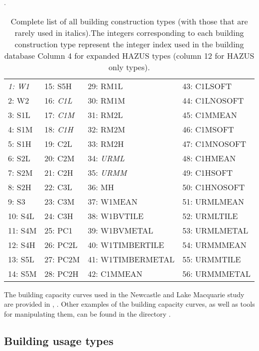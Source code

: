 \begin{table}[htp]
\centering \caption{Complete list of all building construction
types (with those that are rarely used in italics).The integers
corresponding to each building construction type represent the
integer index used in the building database Column 4 for expanded HAZUS types (column 12 for HAZUS
only types).} \vspace{0.8em} \label{tab:v-dam-allbtypes}.
\begin{tabular}{|llll|}
 \hline
\it 1: W1 &   15: S5H &     29: RM1L &           43: C1LSOFT  \\
    2: W2 &   16: \it C1L & 30: RM1M &           44: C1LNOSOFT \\
    3: S1L &  17: \it C1M & 31: RM2L &           45: C1MMEAN \\
    4: S1M &  18: \it C1H & 32: RM2M          &  46: C1MSOFT \\
    5: S1H &  19: C2L &     33: RM2H         &   47: C1MNOSOFT \\
    6: S2L &  20: C2M &     34: \it URML      &  48: C1HMEAN    \\
    7: S2M &  21: C2H &     35: \it URMM     &   49: C1HSOFT \\
    8: S2H &  22: C3L &     36: MH &             50: C1HNOSOFT \\
    9: S3 &   23: C3M &     37: W1MEAN &         51: URMLMEAN \\
    10: S4L & 24: C3H &     38: W1BVTILE&        52: URMLTILE  \\
    11: S4M & 25: PC1 &     39: W1BVMETAL&       53: URMLMETAL \\
    12: S4H & 26: PC2L &    40: W1TIMBERTILE  &  54: URMMMEAN \\
    13: S5L & 27: PC2M &    41: W1TIMBERMETAL  & 55: URMMTILE  \\
    14: S5M & 28: PC2H &    42: C1MMEAN       &  56: URMMMETAL \\
 \hline
\end{tabular}
\end{table}

The building capacity curves used in the
Newcastle and Lake Macquarie study \citep{dr_Fulford02a} are
provided in ,
. Other examples of the
building capacity curves, as well as tools
for manipulating them, can be found in the directory
.


\subsection{Building usage types}
\label{sec:grids-usageclass}

